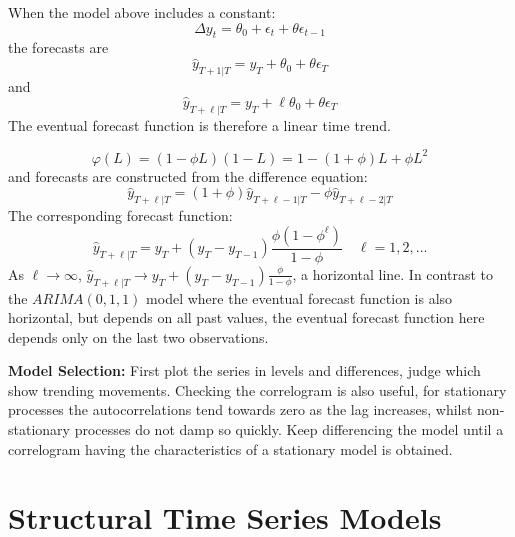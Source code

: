 \documentclass[DIV=14,titlepage=false]{scrreprt}
\begin{document}
\begin{example}
    When the model above includes a constant:
    \[
        \Delta y_t = \theta_0  + \epsilon_t + \theta \epsilon_{t-1}
    \]
    the forecasts are
    \[
        \hat{y}_{T+1|T} = y_T + \theta_0 + \theta \epsilon_T
    \]
    and
    \[
        \hat{y}_{T+\ell|T} = y_T + \ell \theta_0 + \theta \epsilon_T
    \]
    The eventual forecast function is therefore a linear time trend.
\end{example}
\begin{example}[ARIMA(1,1,0)]
    \[
        \varphi(L) = (1-\phi L)(1-L) = 1 - (1+\phi)L + \phi L^2
    \]
    and forecasts are constructed from the difference equation:
    \[
        \hat y_{T+\ell|T} = (1+\phi) \hat y_{T+\ell-1|T} - \phi \hat y_{T+\ell-2|T}
    \]
    The corresponding forecast function:
    \[
        \hat y_{T+\ell|T} = y_T + (y_T - y_{T-1}) \frac{\phi(1-\phi^\ell)}{1-\phi} \quad \ell = 1,2,\ldots
    \]
    As $\ell \to \infty$, $\hat y_{T+\ell|T} \to y_T + (y_T - y_{T-1}) \frac{\phi}{1-\phi}$, a horizontal line. In contrast to the $ARIMA(0,1,1)$ model where the eventual forecast function is also horizontal, but depends on all past values, the eventual forecast function here depends only on the last two observations.
\end{example}
\begin{note}
\textbf{Model Selection:} First plot the series in levels and differences, judge which show trending movements. Checking the correlogram is also useful, for stationary processes the autocorrelations tend towards zero as the lag increases, whilst non-stationary processes do not damp so quickly. Keep differencing the model until a correlogram having the characteristics of a stationary model is obtained.
\end{note}
\section{Structural Time Series Models}
\end{document}
